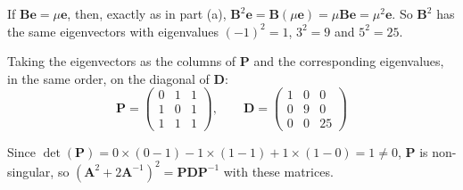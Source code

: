 \documentclass[leqno]{article}
\begin{document}
\begin{enumerate}[
  label=\textbf{\arabic*.},
  leftmargin=*,
  topsep=0pt,
  partopsep=0pt,
  parsep=0pt
]
\begin{djsSolution}
\begin{enumerate}[label=\textbf{(\alph*)}, start=1]
If \(\mathbf{B}\mathbf{e}=\mu\mathbf{e}\), then, exactly as in part (a), \(\mathbf{B}^2\mathbf{e}=\mathbf{B}(\mu\mathbf{e})=\mu\mathbf{B}\mathbf{e}=\mu^2\mathbf{e}\). So \(\mathbf{B}^2\) has the same eigenvectors with eigenvalues \((-1)^2=1\), \(3^2=9\) and \(5^2=25\).

Taking the eigenvectors as the columns of \(\mathbf{P}\) and the corresponding eigenvalues, in the same order, on the diagonal of \(\mathbf{D}\):
\[
\mathbf{P}=\begin{pmatrix} 0 & 1 & 1 \\ 1 & 0 & 1 \\ 1 & 1 & 1 \end{pmatrix},\qquad \mathbf{D}=\begin{pmatrix} 1 & 0 & 0 \\ 0 & 9 & 0 \\ 0 & 0 & 25 \end{pmatrix}
\]

Since \(\det(\mathbf{P})=0\times(0-1)-1\times(1-1)+1\times(1-0)=1\neq0\), \(\mathbf{P}\) is non-singular, so \(\left(\mathbf{A}^2+2\mathbf{A}^{-1}\right)^2=\mathbf{P}\mathbf{D}\mathbf{P}^{-1}\) with these matrices.
\end{enumerate}
\end{djsSolution}

\newpage

\questionitem


\end{enumerate}
\end{document}
